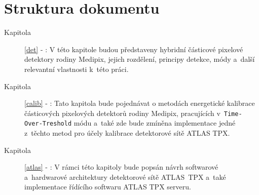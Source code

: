 	
\section{Struktura dokumentu}
\begin{description}
	\item[Kapitola] \ref{det} - :
		V této kapitole budou představeny hybridní částicové pixelové detektory rodiny Medipix, jejich rozdělení, principy detekce, módy a~další relevantní vlastnosti k~této práci.
	\item[Kapitola] \ref{calib} - :
		Tato kapitola bude pojednávat o metodách energetické kalibrace částicových pixelových detektorů rodiny Medipix, pracujících v~\texttt{Time-Over-Treshold} módu a~také zde bude zmíněna implementace jedné z~těchto metod pro účely kalibrace detektorové sítě ATLAS TPX.
	\item[Kapitola] \ref{atlas} - :
		V rámci této kapitoly bude popsán návrh softwarové a~hardwarové architektury detektorové sítě ATLAS~TPX a~také implementace řídícího softwaru ATLAS TPX serveru.
\end{description}